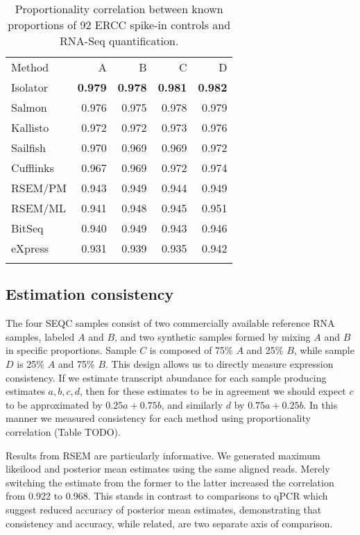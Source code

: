 \documentclass[twocolumn]{article}
\begin{document}
\begin{table}\begin{tabular}[c]{@{}lrrrr@{}}
\toprule\addlinespace
Method & A & B & C & D
\\\addlinespace
\midrule
Isolator & \textbf{0.979} & \textbf{0.978} & \textbf{0.981} &
\textbf{0.982}
\\\addlinespace
Salmon & 0.976 & 0.975 & 0.978 & 0.979
\\\addlinespace
Kallisto & 0.972 & 0.972 & 0.973 & 0.976
\\\addlinespace
Sailfish & 0.970 & 0.969 & 0.969 & 0.972
\\\addlinespace
Cufflinks & 0.967 & 0.969 & 0.972 & 0.974
\\\addlinespace
RSEM/PM & 0.943 & 0.949 & 0.944 & 0.949
\\\addlinespace
RSEM/ML & 0.941 & 0.948 & 0.945 & 0.951
\\\addlinespace
BitSeq & 0.940 & 0.949 & 0.943 & 0.946
\\\addlinespace
eXpress & 0.931 & 0.939 & 0.935 & 0.942
\\\addlinespace
\bottomrule
\addlinespace
\end{tabular}
\caption{Proportionality correlation between known proportions of 92
ERCC spike-in controls and RNA-Seq quantification.}
\end{table}

\subsection{Estimation consistency}\label{estimation-consistency}

The four SEQC samples consist of two commercially available reference
RNA samples, labeled $A$ and $B$, and two synthetic samples formed by
mixing $A$ and $B$ in specific proportions. Sample $C$ is composed of
75\% $A$ and 25\% $B$, while sample $D$ is 25\% $A$ and 75\% $B$. This
design allows us to directly measure expression consistency. If we
estimate transcript abundance for each sample producing estimates
$a, b, c, d$, then for these estimates to be in agreement we should
expect $c$ to be approximated by $0.25a + 0.75b$, and similarly $d$ by
$0.75a + 0.25b$. In this manner we measured consistency for each method
using proportionality correlation (Table TODO).

Results from RSEM are particularly informative. We generated maximum
likeilood and posterior mean estimates using the same aligned reads.
Merely switching the estimate from the former to the latter increased
the correlation from 0.922 to 0.968. This stands in contrast to
comparisons to qPCR which suggest reduced accuracy of posterior mean
estimates, demonstrating that consistency and accuracy, while related,
are two separate axis of comparison.
\end{document}
